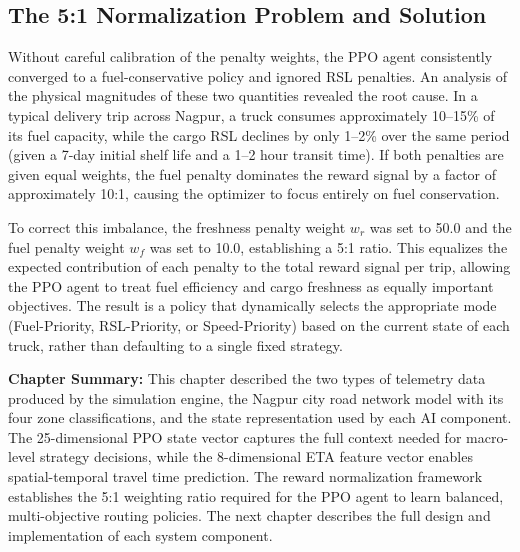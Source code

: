 \subsection{The 5:1 Normalization Problem and Solution}

Without careful calibration of the penalty weights, the PPO agent consistently
converged to a fuel-conservative policy and ignored RSL penalties. An analysis of
the physical magnitudes of these two quantities revealed the root cause. In a
typical delivery trip across Nagpur, a truck consumes approximately 10--15\% of
its fuel capacity, while the cargo RSL declines by only 1--2\% over the same
period (given a 7-day initial shelf life and a 1--2 hour transit time). If both
penalties are given equal weights, the fuel penalty dominates the reward signal by
a factor of approximately 10:1, causing the optimizer to focus entirely on fuel
conservation.

To correct this imbalance, the freshness penalty weight $w_r$ was set to 50.0
and the fuel penalty weight $w_f$ was set to 10.0, establishing a 5:1 ratio. This
equalizes the expected contribution of each penalty to the total reward signal per
trip, allowing the PPO agent to treat fuel efficiency and cargo freshness as equally
important objectives. The result is a policy that dynamically selects the
appropriate mode (Fuel-Priority, RSL-Priority, or Speed-Priority) based on the
current state of each truck, rather than defaulting to a single fixed strategy.

\vspace{1cm}
\noindent \textbf{Chapter Summary:} This chapter described the two types of
telemetry data produced by the simulation engine, the Nagpur city road network
model with its four zone classifications, and the state representation used by
each AI component. The 25-dimensional PPO state vector captures the full context
needed for macro-level strategy decisions, while the 8-dimensional ETA feature
vector enables spatial-temporal travel time prediction. The reward normalization
framework establishes the 5:1 weighting ratio required for the PPO agent to learn
balanced, multi-objective routing policies. The next chapter describes the full
design and implementation of each system component.
